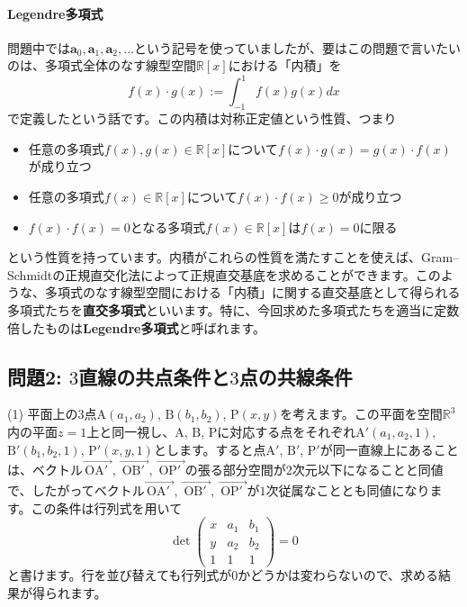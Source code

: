 \paragraph{Legendre多項式}

問題中では$\bm{a}_0, \bm{a}_1, \bm{a}_2, \ldots$という記号を使っていましたが、要はこの問題で言いたいのは、多項式全体のなす線型空間$\mathbb{R}[x]$における「内積」を
\[
f(x) \cdot g(x) := \int_{-1}^1 f(x)g(x) dx
\]
で定義したという話です。この内積は対称正定値という性質、つまり
\begin{itemize}
\item 任意の多項式$f(x), g(x) \in \mathbb{R}[x]$について$f(x) \cdot g(x) = g(x) \cdot f(x)$が成り立つ
\item 任意の多項式$f(x) \in \mathbb{R}[x]$について$f(x) \cdot f(x) \geq 0$が成り立つ
\item $f(x) \cdot f(x) = 0$となる多項式$f(x) \in \mathbb{R}[x]$は$f(x) = 0$に限る
\end{itemize}
という性質を持っています。内積がこれらの性質を満たすことを使えば、Gram--Schmidtの正規直交化法によって正規直交基底を求めることができます。このような、多項式のなす線型空間における「内積」に関する直交基底として得られる多項式たちを\textbf{直交多項式}といいます。特に、今回求めた多項式たちを適当に定数倍したものは\textbf{Legendre多項式}と呼ばれます。

\subsection{問題2: $3$直線の共点条件と$3$点の共線条件}

\noindent (1) 平面上の$3$点$\mathrm{A}(a_1, a_2)$, $\mathrm{B}(b_1, b_2)$, $\mathrm{P}(x, y)$を考えます。この平面を空間$\mathbb{R}^3$内の平面$z = 1$上と同一視し、$\mathrm{A}$, $\mathrm{B}$, $\mathrm{P}$に対応する点をそれぞれ$\mathrm{A}'(a_1, a_2, 1)$, $\mathrm{B}'(b_1, b_2, 1)$, $\mathrm{P}'(x, y, 1)$とします。すると点$\mathrm{A}'$, $\mathrm{B}'$, $\mathrm{P}'$が同一直線上にあることは、ベクトル$\overrightarrow{\,\mathrm{OA}'\,\,}$, $\overrightarrow{\,\mathrm{OB}'\,\,}$, $\overrightarrow{\,\mathrm{OP}'\,\,}$の張る部分空間が$2$次元以下になることと同値で、したがってベクトル$\overrightarrow{\,\mathrm{OA}'\,\,}$, $\overrightarrow{\,\mathrm{OB}'\,\,}$, $\overrightarrow{\,\mathrm{OP}'\,\,}$が$1$次従属なこととも同値になります。この条件は行列式を用いて
\[
\det
\begin{pmatrix}
x & a_1 & b_1 \\
y & a_2 & b_2 \\
1 & 1 & 1
\end{pmatrix}
= 0
\]
と書けます。行を並び替えても行列式が$0$かどうかは変わらないので、求める結果が得られます。

